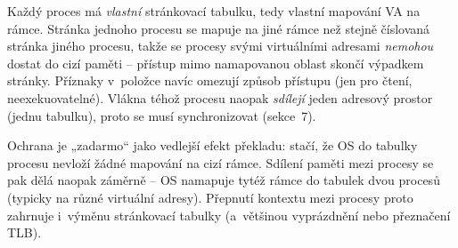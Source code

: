 \begin{definice}
Každý proces má \emph{vlastní} stránkovací tabulku, tedy vlastní mapování VA na rámce. Stránka jednoho procesu se mapuje na jiné rámce než stejně číslovaná stránka jiného procesu, takže se procesy svými virtuálními adresami \emph{nemohou} dostat do cizí paměti -- přístup mimo namapovanou oblast skončí výpadkem stránky. Příznaky v~položce navíc omezují způsob přístupu (jen pro čtení, neexekuovatelné). Vlákna téhož procesu naopak \emph{sdílejí} jeden adresový prostor (jednu tabulku), proto se musí synchronizovat (sekce~7).
\end{definice}

\begin{intuice}
Ochrana je „zadarmo`` jako vedlejší efekt překladu: stačí, že OS do tabulky procesu nevloží žádné mapování na cizí rámce. Sdílení paměti mezi procesy se pak dělá naopak záměrně -- OS namapuje tytéž rámce do tabulek dvou procesů (typicky na různé virtuální adresy). Přepnutí kontextu mezi procesy proto zahrnuje i~výměnu stránkovací tabulky (a~většinou vyprázdnění nebo přeznačení TLB).
\end{intuice}

